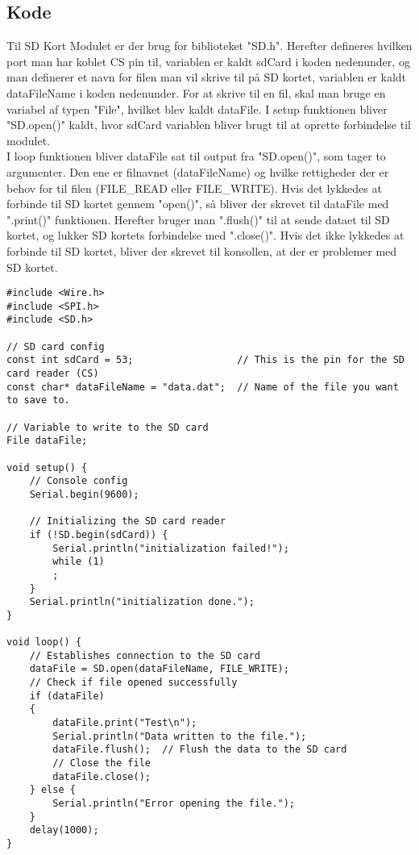 	\subsection{Kode}\label{sec:SDCode}
		Til SD Kort Modulet er der brug for biblioteket "SD.h". Herefter defineres hvilken port man har koblet CS pin til, variablen er kaldt sdCard i koden nedenunder, og man definerer et navn for filen man vil skrive til på SD kortet, variablen er kaldt dataFileName i koden nedenunder. For at skrive til en fil, skal man bruge en variabel af typen "File", hvilket blev kaldt dataFile. I setup funktionen bliver "SD.open()"{} kaldt, hvor sdCard variablen bliver brugt til at oprette forbindelse til modulet. \\ [5pt]
		I loop funktionen bliver dataFile sat til output fra "SD.open()", som tager to argumenter. Den ene er filnavnet (dataFileName) og hvilke rettigheder der er behov for til filen (FILE\_READ eller FILE\_WRITE). Hvis det lykkedes at forbinde til SD kortet gennem "open()", så bliver der skrevet til dataFile med ".print()"{} funktionen. Herefter bruger man ".flush()"{} til at sende dataet til SD kortet, og lukker SD kortets forbindelse med ".close()". Hvis det ikke lykkedes at forbinde til SD kortet, bliver der skrevet til konsollen, at der er problemer med SD kortet.
		\begin{lstlisting}
#include <Wire.h>
#include <SPI.h>
#include <SD.h>

// SD card config
const int sdCard = 53;                  // This is the pin for the SD card reader (CS)
const char* dataFileName = "data.dat";  // Name of the file you want to save to.

// Variable to write to the SD card
File dataFile;

void setup() {
	// Console config
	Serial.begin(9600);
	
	// Initializing the SD card reader
	if (!SD.begin(sdCard)) {
		Serial.println("initialization failed!");
		while (1)
		;
	}
	Serial.println("initialization done.");
}

void loop() {
	// Establishes connection to the SD card
	dataFile = SD.open(dataFileName, FILE_WRITE);
	// Check if file opened successfully
	if (dataFile)
	{
		dataFile.print("Test\n");
		Serial.println("Data written to the file.");
		dataFile.flush();  // Flush the data to the SD card
		// Close the file
		dataFile.close();
	} else {
		Serial.println("Error opening the file.");
	}
	delay(1000);
}
		\end{lstlisting}